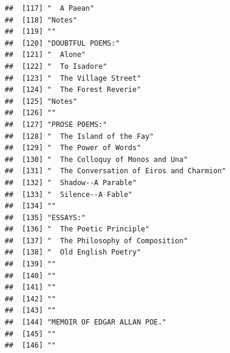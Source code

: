 \documentclass{article}\usepackage[]{graphicx}\usepackage[]{color}
\makeatletter
\newenvironment{kframe}{%
 \def\at@end@of@kframe{}%
 \ifinner\ifhmode%
  \def\at@end@of@kframe{\end{minipage}}%
  \begin{minipage}{\columnwidth}%
 \fi\fi%
 \def\FrameCommand##1{\hskip\@totalleftmargin \hskip-\fboxsep
 \colorbox{shadecolor}{##1}\hskip-\fboxsep
     \hskip-\linewidth \hskip-\@totalleftmargin \hskip\columnwidth}%
 \MakeFramed {\advance\hsize-\width
   \@totalleftmargin\z@ \linewidth\hsize
   \@setminipage}}%
 {\par\unskip\endMakeFramed%
 \at@end@of@kframe}
\newenvironment{knitrout}{}{} %
\makeatother
\begin{document}
\begin{knitrout}
\begin{kframe}
\begin{verbatim}
##  [117] "  A Paean"                                                                   
##  [118] "Notes"                                                                       
##  [119] ""                                                                            
##  [120] "DOUBTFUL POEMS:"                                                             
##  [121] "  Alone"                                                                     
##  [122] "  To Isadore"                                                                
##  [123] "  The Village Street"                                                        
##  [124] "  The Forest Reverie"                                                        
##  [125] "Notes"                                                                       
##  [126] ""                                                                            
##  [127] "PROSE POEMS:"                                                                
##  [128] "  The Island of the Fay"                                                     
##  [129] "  The Power of Words"                                                        
##  [130] "  The Colloquy of Monos and Una"                                             
##  [131] "  The Conversation of Eiros and Charmion"                                    
##  [132] "  Shadow--A Parable"                                                         
##  [133] "  Silence--A Fable"                                                          
##  [134] ""                                                                            
##  [135] "ESSAYS:"                                                                     
##  [136] "  The Poetic Principle"                                                      
##  [137] "  The Philosophy of Composition"                                             
##  [138] "  Old English Poetry"                                                        
##  [139] ""                                                                            
##  [140] ""                                                                            
##  [141] ""                                                                            
##  [142] ""                                                                            
##  [143] ""                                                                            
##  [144] "MEMOIR OF EDGAR ALLAN POE."                                                  
##  [145] ""                                                                            
##  [146] ""                                                                            

\end{verbatim}
\end{kframe}
\end{knitrout}
\end{document}
